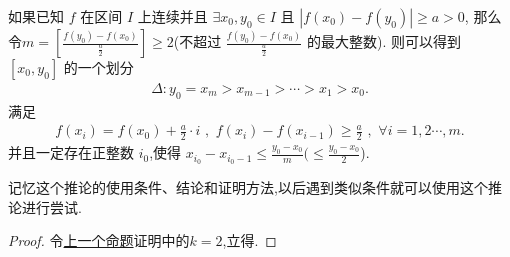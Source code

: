 \documentclass[lang=cn,newtx,10pt,scheme=chinese]{elegantbook}
\begin{document}
\begin{corollary}\label{cor::连续函数在固定的两点之间寻找充分近的两点,同时保持两点函数值之差足够大}
    如果已知 \(f\) 在区间 \(I\) 上连续并且 \(\exists x_0,y_0\in I\) 且 \(\left| f\left( x_0 \right) -f\left( y_0 \right) \right|\geq a>0\),
    那么令\(m=\left[ \frac{f\left( y_0 \right) -f\left( x_0 \right)}{\frac{a}{2}} \right]\geq 2\)(不超过 \(\frac{f\left( y_0 \right) -f\left( x_0 \right)}{\frac{a}{2}}\) 的最大整数).
则可以得到 \(\left[ x_0,y_0 \right]\) 的一个划分 
\begin{align*}
\Delta :y_0=x_m>x_{m - 1}>\cdots >x_1>x_0.
\end{align*}
满足 \begin{align*}
    f\left( x_i \right) = f\left( x_0 \right) + \frac{a}{2}\cdot i\,\,,\,\,f\left( x_i \right) - f\left( x_{i - 1} \right) \geq \frac{a}{2}\,\,,\,\,\forall i = 1,2\cdots,m.
\end{align*}
并且一定存在正整数 \(i_0\),使得 \(x_{i_0}-x_{i_0 - 1}\leq \frac{y_0 - x_0}{m}(\leq \frac{y_0 - x_0}{2}\)).
\end{corollary}
\begin{remark}
    记忆这个推论的使用条件、结论和证明方法,以后遇到类似条件就可以使用这个推论进行尝试.
\end{remark}
\begin{proof}
    令\hyperref[pro:连续函数在固定的两点之间寻找充分近的两点,同时保持两点函数值之差足够大]{上一个命题}证明中的$k=2$,立得.
\end{proof}
\end{document}
